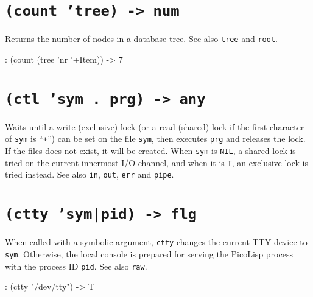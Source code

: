 
\section*{\texttt{(count 'tree) -> num}}
\label{sec:funct-rec-C-(count-'tree)-->-num}


Returns the number of nodes in a database tree. See also \texttt{tree} and
\texttt{root}.


\begin{wideverbatim}
: (count (tree 'nr '+Item))
-> 7
\end{wideverbatim}

 
\section*{\texttt{(ctl 'sym . prg) -> any}}
\label{sec:funct-rec-C-(ctl-'sym-.-prg)-->-any}


Waits until a write (exclusive) lock (or a read (shared) lock if the
first character of \texttt{sym} is ``\texttt{+}'') can be set on the
file \texttt{sym}, then executes \texttt{prg} and releases the lock.
If the files does not exist, it will be created. When \texttt{sym} is
\texttt{NIL}, a shared lock is tried on the current innermost I/O
channel, and when it is \texttt{T}, an exclusive lock is tried
instead. See also \texttt{in}, \texttt{out}, \texttt{err} and
\texttt{pipe}.



 
\section*{\texttt{(ctty 'sym|pid) -> flg}}
\label{sec:funct-rec-C-(ctty-'sym|pid)-->-flg}


When called with a symbolic argument, \texttt{ctty} changes the current TTY
device to \texttt{sym}. Otherwise, the local console is prepared for serving
the PicoLisp process with the process ID \texttt{pid}. See also \texttt{raw}.


\begin{wideverbatim}
: (ctty "/dev/tty")
-> T
\end{wideverbatim}

